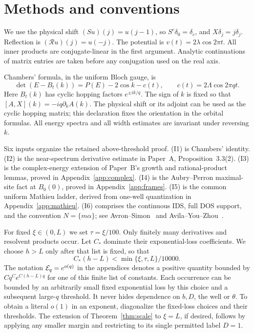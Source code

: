 \section{Methods and conventions}\label{sec:methods}
We use the physical shift $(Su)(j)=u(j-1)$, so $S^c\delta_0=\delta_c$, and $X\delta_j=j\delta_j$. Reflection is $(\mathcal Ru)(j)=u(-j)$. The potential is $v(t)=2\lambda\cos2\pi t$. All inner products are conjugate-linear in the first argument. Analytic continuations of matrix entries are taken before any conjugation used on the real axis.

Chambers' formula, in the uniform Bloch gauge, is
\begin{equation}\label{eq:Chambers}
 \det(E-B_t(k))=P(E)-2\cos k-c(t),\qquad
 c(t)=2\Lambda\cos2\pi qt.
\end{equation}
Here $B_t(k)$ has cyclic hopping factors $e^{\pm ik/q}$. The sign of $k$ is fixed so that $[A,X](k)=-iq\partial_kA(k)$. The physical shift or its adjoint can be used as the cyclic hopping matrix; this declaration fixes the orientation in the orbital formulas. All energy spectra and all width estimates are invariant under reversing $k$.

Six inputs organize the retained above-threshold proof. (I1) is Chambers' identity. (I2) is the near-spectrum derivative estimate in Paper~A, Proposition~3.3(2). (I3) is the complex-energy extension of Paper~B's growth and rational-product lemmas, proved in Appendix~\ref{app:complex}. (I4) is the Aubry--Perron maximal-site fact at $B_0(0)$, proved in Appendix~\ref{app:frames}. (I5) is the common uniform Mathieu ladder, derived from one-well quantization in Appendix~\ref{app:mathieu}. (I6) comprises the continuous IDS, full DOS support, and the convention $N=\{m\alpha\}$; see Avron--Simon~\cite{AvronSimon} and Avila--You--Zhou~\cite[Section~1]{AYZdry}.

For fixed $\xi\in(0,L)$ we set $\tau=\xi/100$. Only finitely many derivatives and resolvent products occur. Let $C_*$ dominate their exponential-loss coefficients. We choose $h>L$ only after that list is fixed, so that
\begin{equation}\label{eq:slack}
 C_*(h-L)<\min\{\xi,\tau,L\}/10000.
\end{equation}
The notation $\mathcal E_q=e^{o(q)}$ in the appendices denotes a positive quantity bounded by $Cq^Ce^{C(h-L)q}$ for one of this finite list of constants. Each occurrence can be bounded by an arbitrarily small fixed exponential loss by this choice and a subsequent large-$q$ threshold. It never hides dependence on $b,D$, the well or $\theta$. To obtain a literal $o(1)$ in an exponent, diagonalize the fixed-loss choices and their thresholds. The extension of Theorem~\ref{thm:scale} to $\xi=L$, if desired, follows by applying any smaller margin and restricting to its single permitted label $D=1$.

